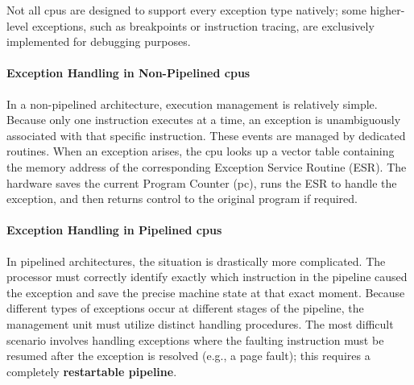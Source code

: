 \noindent Not all \glspl{cpu} are designed to support every exception type natively; some higher-level exceptions, such as breakpoints or instruction tracing, are exclusively implemented for debugging purposes.

\paragraph{Exception Handling in Non-Pipelined \glspl{cpu}} 
In a non-pipelined architecture, execution management is relatively simple. Because only one instruction executes at a time, an exception is unambiguously associated with that specific instruction. These events are managed by dedicated routines. When an exception arises, the \gls{cpu} looks up a vector table containing the memory address of the corresponding Exception Service Routine (ESR). The hardware saves the current Program Counter (\gls{pc}), runs the ESR to handle the exception, and then returns control to the original program if required.

\paragraph{Exception Handling in Pipelined \glspl{cpu}} 
In pipelined architectures, the situation is drastically more complicated. The processor must correctly identify exactly which instruction in the pipeline caused the exception and save the precise machine state at that exact moment. Because different types of exceptions occur at different stages of the pipeline, the management unit must utilize distinct handling procedures. The most difficult scenario involves handling exceptions where the faulting instruction must be resumed after the exception is resolved (e.g., a page fault); this requires a completely \textbf{restartable pipeline}.


